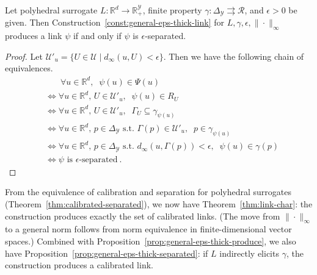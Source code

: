 \documentclass[twoside,11pt]{article}
\newcommand{\reals}{\mathbb{R}}
\newcommand{\simplex}{\Delta_\Y}
\newcommand{\R}{\mathcal{R}}
\newcommand{\U}{\mathcal{U}}
\newcommand{\Y}{\mathcal{Y}}
\newcommand{\toto}{\rightrightarrows}
\begin{document}
\begin{proposition}\label{prop:link-converse}
  Let polyhedral surrogate $L:\reals^d \to \reals^\Y_+$, finite property $\gamma:\simplex\toto\R$, and $\epsilon>0$ be given.
  Then Construction~\ref{const:general-eps-thick-link} for $L,\gamma,\epsilon,\|\cdot\|_\infty$ produces a link $\psi$ if and only if $\psi$ is $\epsilon$-separated.
\end{proposition}
\begin{proof}
  Let $\U'_u = \{U\in\U \mid d_{\infty}(u,U) < \epsilon\}$.
  Then we have the following chain of equivalences.  
  \begin{align*}
    &\phantom{\iff}~\forall u\in\reals^d,\;\; \psi(u)\in\Psi(u)
    \\
    &\iff \forall u\in\reals^d,\, U\in\U'_u,\;\; \psi(u)\in R_U
    \\
    &\iff \forall u\in\reals^d,\, U\in\U'_u,\;\; \Gamma_U \subseteq \gamma_{\psi(u)}
    \\
    &\iff \forall u\in\reals^d,\, p\in\simplex \text{ s.t. } \Gamma(p)\in\U'_u,\;\; p \in \gamma_{\psi(u)}
    \\
    &\iff \forall u\in\reals^d,\, p\in\simplex \text{ s.t. } d_\infty(u,\Gamma(p)) < \epsilon,\;\; \psi(u) \in \gamma(p)
    \\
    &\iff \text{$\psi$ is $\epsilon$-separated}~.
  \end{align*}
\end{proof}

From the equivalence of calibration and separation for polyhedral surrogates (Theorem~\ref{thm:calibrated-separated}), we now have Theorem~\ref{thm:link-char}: the construction produces exactly the set of calibrated links.
(The move from $\|\cdot\|_\infty$ to a general norm follows from norm equivalence in finite-dimensional vector spaces.)
Combined with Proposition~\ref{prop:general-eps-thick-produce}, we also have Proposition~\ref{prop:general-eps-thick-separated}: if $L$ indirectly elicits $\gamma$, the construction produces a calibrated link.
\end{document}
